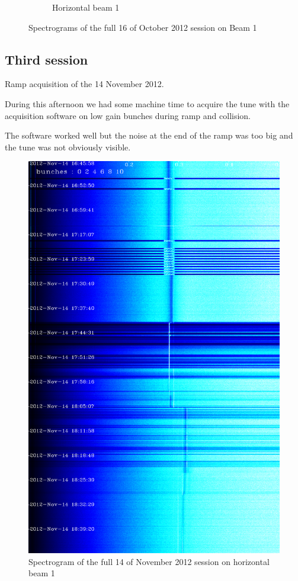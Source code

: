 \begin{figure}[H]
\begin{subfigure}{.5\textwidth}
  \caption{Horizontal beam 1}
\end{subfigure}
\caption{Spectrograms of the full 16 of October 2012 session on Beam 1}
\end{figure}

\subsection{Third session}

Ramp acquisition of the 14 November 2012. 

During this afternoon we had some machine time to acquire the tune with the acquisition software on low gain bunches during ramp and collision.

The software worked well but the noise at the end of the ramp was too big and the tune was not obviously visible.

\begin{figure}[H]
\centering
\caption{Spectrogram of the full 14 of November 2012 session on horizontal beam 1}
\includegraphics[scale=0.3]{md-121114-hb1-bunches111111-16.png}
\end{figure}

